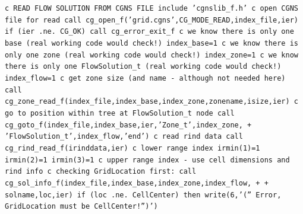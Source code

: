 \documentclass[12pt]{article}
\begin{document}
{\tt \noindent c  READ FLOW SOLUTION FROM CGNS FILE
\newline\indent      include 'cgnslib\_f.h'
\newline c  open CGNS file for read
\newline\indent      call cg\_open\_f('grid.cgns',CG\_MODE\_READ,index\_file,ier)
\newline\indent      if (ier .ne. CG\_OK) call cg\_error\_exit\_f
\newline c  we know there is only one base (real working code would check!)
\newline\indent      index\_base=1
\newline c  we know there is only one zone (real working code would check!)
\newline\indent      index\_zone=1
\newline c  we know there is only one FlowSolution\_t (real working code would check!)
\newline\indent      index\_flow=1
\newline c   get zone size (and name - although not needed here)
\newline\indent      call cg\_zone\_read\_f(index\_file,index\_base,index\_zone,zonename,isize,ier)
\newline c  go to position within tree at FlowSolution\_t node
\newline\indent      call cg\_goto\_f(index\_file,index\_base,ier,'Zone\_t',index\_zone,
\newline + \indent 'FlowSolution\_t',index\_flow,'end')
\newline c  read rind data
\newline\indent      call cg\_rind\_read\_f(irinddata,ier)
\newline c   lower range index
\newline\indent      irmin(1)=1
\newline\indent      irmin(2)=1
\newline\indent      irmin(3)=1
\newline c   upper range index - use cell dimensions and rind info
\newline c   checking GridLocation first:
\newline\indent      call cg\_sol\_info\_f(index\_file,index\_base,index\_zone,index\_flow,
\newline + \indent     + solname,loc,ier)
\newline\indent      if (loc .ne. CellCenter) then
\newline\indent\indent        write(6,'('' Error, GridLocation must be CellCenter!'')')
}
\end{document}
